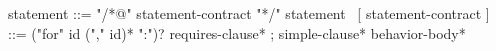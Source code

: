 \begin{syntax}
  statement ::= "/*@" statement-contract "*/" statement
  \
  [ statement-contract ] ::= {("for" id ("," id)* ":")?} requires-clause* ;
    simple-clause* behavior-body*
\end{syntax}
